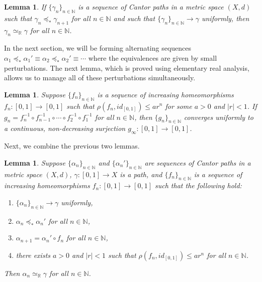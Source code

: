 \documentclass[12pt, leqno]{amsart}
\newcommand{\ord}{\preceq_{\ast}}
\newcommand{\ui}{[0,1]}
\newcommand{\den}{\simeq_{\bbr}}
\newcommand{\bbn}{\mathbb{N}}
\newcommand{\bbr}{\mathbb{R}}
\newtheorem{lemma}[theorem]{Lemma}
\theoremstyle{definition}\newtheorem{definition}[theorem]{Definition}
\begin{document}
\begin{lemma}\label{gammaextensionlemma}
If $\{\gamma_n\}_{n\in\bbn}$ is a sequence of Cantor paths in a metric space $(X,d)$ such that $\gamma_n\ord\gamma_{n+1}$ for all $n\in\bbn$ and such that $\{\gamma_n\}_{n\in\bbn}\to \gamma$ uniformly, then $\gamma_n\den\gamma$ for all $n\in\bbn$.
\end{lemma}

In the next section, we will be forming alternating sequences $\alpha_1\ord \alpha_{1}'\equiv \alpha_2\ord \alpha_2'\equiv \cdots$ where the equivalences are given by small perturbations. The next lemma, which is proved using elementary real analysis, allows us to manage all of these perturbations simultaneously.

\begin{lemma}\label{infinitecompositionlemma}
Suppose $\{f_n\}_{n\in\bbn}$ is a sequence of increasing homeomorphisms $f_n:\ui\to\ui$ such that $\rho(f_n,id_{\ui})\leq ar^n$ for some $a>0$ and $|r|<1$. If $g_n=f_{n}^{-1}\circ f_{n-1}^{-1}\circ \cdots \circ f_{2}^{-1}\circ f_{1}^{-1}$ for all $n\in\bbn$, then $\{g_n\}_{n\in\bbn}$ converges uniformly to a continuous, non-decreasing surjection $g_{\infty}:\ui\to\ui$.
\end{lemma}

Next, we combine the previous two lemmas.

\begin{lemma}\label{alternatinglemma}
Suppose $\{\alpha_n\}_{n\in\bbn}$ and $\{\alpha_{n}'\}_{n\in\bbn}$ are sequences of Cantor paths in a metric space $(X,d)$, $\gamma:\ui\to X$ is a path, and $\{f_n\}_{n\in\bbn}$ is a sequence of increasing homeomorphisms $f_n:\ui\to\ui$ such that the following hold:
\begin{enumerate}
\item $\{\alpha_n\}_{n\in\bbn}\to \gamma$ uniformly,
\item $\alpha_n\ord\alpha_n'$ for all $n\in\bbn$,
\item $\alpha_{n+1}=\alpha_{n}'\circ f_n$ for all $n\in\bbn$,
\item there exists $a>0$ and $|r|<1$ such that $\rho(f_n,id_{\ui})\leq ar^n$ for all $n\in\bbn$.
\end{enumerate}
Then $\alpha_n\den\gamma$ for all $n\in\bbn$.
\end{lemma}
\end{document}
